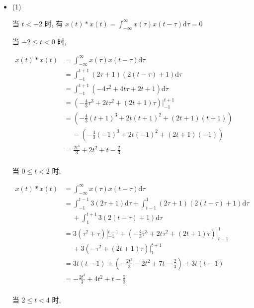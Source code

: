 \documentclass[a4paper,UTF8]{article}
\numberwithin{equation}{section}
\begin{document}
\begin{framed}
\begin{spacing}{1.5}
    \begin{itemize}
      \item (1)

      当 $t < -2$ 时, 有 $\displaystyle x(t) * x(t) = \int_{-\infty}^{\infty}x(\tau)x(t-\tau)\mathrm{d}\tau = 0$

      当 $-2 \le t < 0$ 时, 
      
      $
      \begin{aligned}
      x(t) * x(t) &= \int_{-\infty}^{\infty}x(\tau)x(t-\tau)\mathrm{d}\tau  \\
      &= \int_{-1}^{t+1}(2\tau+1)(2(t-\tau)+1)\mathrm{d}\tau  \\
      &= \int_{-1}^{t+1}(- 4 \tau^{2} + 4 t \tau + 2 t + 1)\mathrm{d}\tau  \\
      &= (- \frac{4}{3} \tau^{3} + 2 t \tau^{2} + (2 t + 1)\tau)|_{-1}^{t+1}  \\
      &= (- \frac{4}{3} (t+1)^{3} + 2 t (t+1)^{2} + (2 t + 1)(t+1)) \\
      &\quad\ - (- \frac{4}{3} (-1)^{3} + 2 t (-1)^{2} + (2 t + 1)(-1))  \\
      &= \frac{2 t^{3}}{3} + 2 t^{2} + t - \frac{2}{3}  \\
      \end{aligned}
      $
      
      当 $0 \le t < 2$ 时,
      
      $
      \begin{aligned}
      x(t) * x(t) &= \int_{-\infty}^{\infty}x(\tau)x(t-\tau)\mathrm{d}\tau  \\
      &= \int_{-1}^{t-1}3(2\tau+1)\mathrm{d}\tau + \int_{t-1}^{1}(2\tau+1)(2(t-\tau)+1)\mathrm{d}\tau \\
      &\quad\ + \int_{1}^{t+1}3(2(t-\tau)+1)\mathrm{d}\tau  \\
      &= 3(\tau^{2}+\tau)|_{-1}^{t-1} + (- \frac{4}{3} \tau^{3} + 2 t \tau^{2} + (2 t + 1)\tau)|_{t-1}^{1} \\
      &\quad\ + 3(-\tau^{2} + (2 t+1)\tau)|_{1}^{t+1}  \\
      &= 3t (t - 1) + (- \frac{2 t^{3}}{3} - 2 t^{2} + 7 t - \frac{2}{3}) + 3t (t - 1) \\
      &= - \frac{2 t^{3}}{3} + 4 t^{2} + t - \frac{2}{3} \\
      \end{aligned}
      $
      
      当 $2 \le t < 4$ 时,
      

\end{itemize}
\end{spacing}
\end{framed}
\end{document}
